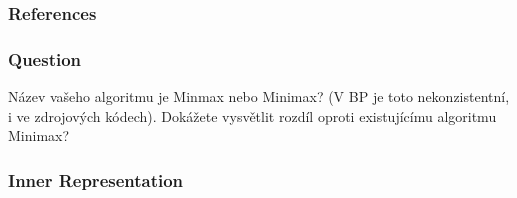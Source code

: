 \documentclass[10pt,xcolor=pdflatex]{beamer}
\begin{document}
\begin{frame}[allowframebreaks]
	\frametitle{References}
	\printbibliography
\end{frame}


\appendix

\begin{frame}\frametitle{Question}
    Název vašeho algoritmu je Minmax nebo Minimax? (V BP je toto nekonzistentní, i ve zdrojových kódech). Dokážete vysvětlit rozdíl oproti existujícímu algoritmu Minimax?
\end{frame}

\begin{frame}\frametitle{Inner Representation}
  \begin{figure}[h]
  \centering
  \label{fig:tikz:IDStree}
\end{figure}
\end{frame}
\end{document}
